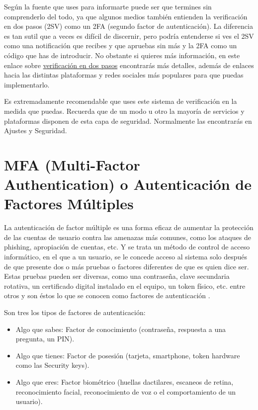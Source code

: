 \documentclass[
  spanish,
  a4paper,
  openany]{book}
\begin{document}
Según la fuente que uses para informarte puede ser que termines sin comprenderlo del todo, ya que algunos medios también entienden la verificación en dos pasos (2SV) como un 2FA (segundo factor de autenticación). La diferencia es tan sutil que a veces es difícil de discernir, pero podría entenderse si ves el 2SV como una notificación que recibes y que apruebas sin más y la 2FA como un código que has de introducir. No obstante si quieres más información, en este enlace sobre \href{https://www.osi.es/es/actualidad/blog/2017/01/17/verificacion-en-dos-pasos-que-es-y-como-me-puede-ayudar}{verificación en dos pasos} encontrarás más detalles, además de enlaces hacia las distintas plataformas y redes sociales más populares para que puedas implementarlo.

Es extremadamente recomendable que uses este sistema de verificación en la medida que puedas. Recuerda que de un modo u otro la mayoría de servicios y plataformas disponen de esta capa de seguridad. Normalmente las encontrarás en Ajustes y Seguridad.

\hypertarget{mfa-multi-factor-authentication-o-autenticaciuxf3n-de-factores-muxfaltiples}{%
\section{MFA (Multi-Factor Authentication) o Autenticación de Factores Múltiples}\label{mfa-multi-factor-authentication-o-autenticaciuxf3n-de-factores-muxfaltiples}}

La autenticación de factor múltiple es una forma eficaz de aumentar la protección de las cuentas de usuario contra las amenazas más comunes, como los ataques de phishing, apropiación de cuentas, etc. Y se trata un método de control de acceso informático, en el que a un usuario, se le concede acceso al sistema solo después de que presente dos o más pruebas o factores diferentes de que es quien dice ser. Estas pruebas pueden ser diversas, como una contraseña, clave secundaria rotativa, un certificado digital instalado en el equipo, un token físico, etc. entre otros y son éstos lo que se conocen como factores de autenticación \citep{WIKI-multiple-factor}.

Son tres los tipos de factores de autenticación:

\begin{itemize}
\item
  Algo que sabes: Factor de conocimiento (contraseña, respuesta a una pregunta, un PIN).
\item
  Algo que tienes: Factor de posesión (tarjeta, smartphone, token hardware como las Security keys).
\item
  Algo que eres: Factor biométrico (huellas dactilares, escaneos de retina, reconocimiento facial, reconocimiento de voz o el comportamiento de un usuario).
\end{itemize}
\end{document}
